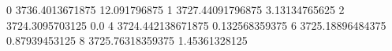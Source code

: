 0 3736.4013671875 12.091796875
1 3727.44091796875 3.13134765625
2 3724.3095703125 0.0
4 3724.442138671875 0.132568359375
6 3725.18896484375 0.87939453125
8 3725.76318359375 1.45361328125
